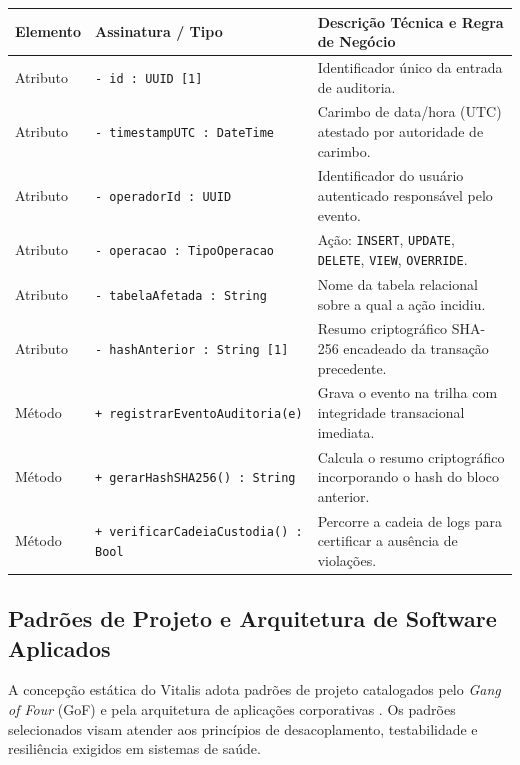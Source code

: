 \begingroup
\small
\noindent\begin{tabularx}{\linewidth}{l >{\raggedright\arraybackslash}p{5.7cm} >{\raggedright\arraybackslash}X}
\toprule
\textbf{Elemento} & \textbf{Assinatura / Tipo} & \textbf{Descrição Técnica e Regra de Negócio} \\
\midrule
Atributo & \texttt{- id : UUID [1]} & Identificador único da entrada de auditoria. \\
Atributo & \texttt{- timestampUTC : DateTime} & Carimbo de data/hora (UTC) atestado por autoridade de carimbo. \\
Atributo & \texttt{- operadorId : UUID} & Identificador do usuário autenticado responsável pelo evento. \\
Atributo & \texttt{- operacao : TipoOperacao} & Ação: \texttt{INSERT}, \texttt{UPDATE}, \texttt{DELETE}, \texttt{VIEW}, \texttt{OVERRIDE}. \\
Atributo & \texttt{- tabelaAfetada : String} & Nome da tabela relacional sobre a qual a ação incidiu. \\
Atributo & \texttt{- hashAnterior : String [1]} & Resumo criptográfico SHA-256 encadeado da transação precedente. \\
\midrule
Método & \texttt{+ registrarEventoAuditoria(e)} & Grava o evento na trilha com integridade transacional imediata. \\
Método & \texttt{+ gerarHashSHA256() : String} & Calcula o resumo criptográfico incorporando o hash do bloco anterior. \\
Método & \texttt{+ verificarCadeiaCustodia() : Bool} & Percorre a cadeia de logs para certificar a ausência de violações. \\
\bottomrule
\end{tabularx}
\endgroup

\subsection{Padrões de Projeto e Arquitetura de Software Aplicados}
\label{subsec:padroes_projeto}

A concepção estática do Vitalis adota padrões de projeto catalogados pelo \textit{Gang of Four} (GoF) \cite{gamma_design_patterns:1994} e pela arquitetura de aplicações corporativas \cite{fowler_patterns:2002}. Os padrões selecionados visam atender aos princípios de desacoplamento, testabilidade e resiliência exigidos em sistemas de saúde.

